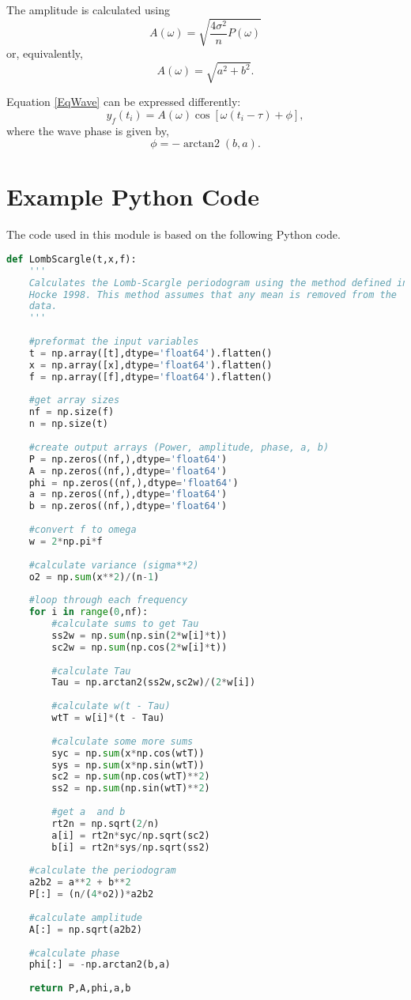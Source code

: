 \documentclass[a4paper,10pt]{article}
\DeclareMathOperator{\atantwo}{arctan2}
\begin{document}
The amplitude is calculated using 
\begin{equation}
	A(\omega) = \sqrt{\frac{4\sigma^2}{n}P(\omega)}
\end{equation}
or, equivalently,
\begin{equation}
	A(\omega) = \sqrt{a^2 + b^2}.
\end{equation}

Equation \ref{EqWave} can be expressed differently:
\begin{equation}
	y_f(t_i) = A(\omega) \cos{\left[\omega (t_i - \tau) + \phi \right]},
\end{equation}
where the wave phase is given by,
\begin{equation}
	\phi = -\atantwo(b,a).
\end{equation}

\section{Example Python Code}
The code used in this module is based on the following Python code.
						
						
\begin{lstlisting}[language=Python]
def LombScargle(t,x,f):
	'''
	Calculates the Lomb-Scargle periodogram using the method defined in
	Hocke 1998. This method assumes that any mean is removed from the
	data.
	'''
	
	#preformat the input variables
	t = np.array([t],dtype='float64').flatten()
	x = np.array([x],dtype='float64').flatten()
	f = np.array([f],dtype='float64').flatten()
	
	#get array sizes
	nf = np.size(f)
	n = np.size(t)
	
	#create output arrays (Power, amplitude, phase, a, b)
	P = np.zeros((nf,),dtype='float64')
	A = np.zeros((nf,),dtype='float64')
	phi = np.zeros((nf,),dtype='float64')
	a = np.zeros((nf,),dtype='float64')
	b = np.zeros((nf,),dtype='float64')
	
	#convert f to omega
	w = 2*np.pi*f
	
	#calculate variance (sigma**2)
	o2 = np.sum(x**2)/(n-1)
	
	#loop through each frequency
	for i in range(0,nf):
		#calculate sums to get Tau
		ss2w = np.sum(np.sin(2*w[i]*t))
		sc2w = np.sum(np.cos(2*w[i]*t))
	
		#calculate Tau
		Tau = np.arctan2(ss2w,sc2w)/(2*w[i])
		
		#calculate w(t - Tau)
		wtT = w[i]*(t - Tau)
		
		#calculate some more sums
		syc = np.sum(x*np.cos(wtT))
		sys = np.sum(x*np.sin(wtT))
		sc2 = np.sum(np.cos(wtT)**2)
		ss2 = np.sum(np.sin(wtT)**2)
	
		#get a  and b
		rt2n = np.sqrt(2/n)
		a[i] = rt2n*syc/np.sqrt(sc2)
		b[i] = rt2n*sys/np.sqrt(ss2)
	
	#calculate the periodogram
	a2b2 = a**2 + b**2
	P[:] = (n/(4*o2))*a2b2
	
	#calculate amplitude
	A[:] = np.sqrt(a2b2)
	
	#calculate phase
	phi[:] = -np.arctan2(b,a)
	
	return P,A,phi,a,b
\end{lstlisting}


\end{document}
